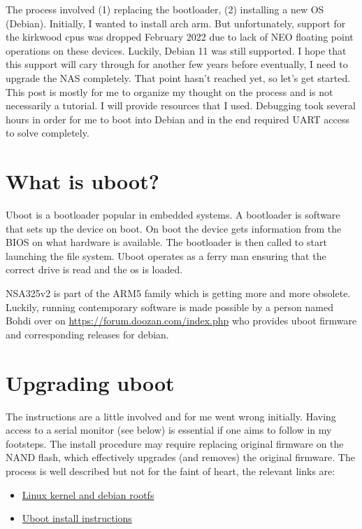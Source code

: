 \documentclass[11pt]{article}
\begin{document}
The  process  involved  (1) replacing  the  bootloader,  (2)
installing a new OS (Debian). Initially, I wanted to install
arch arm.  But unfortunately, support for  the kirkwood cpus
was dropped February 2022 due  to lack of NEO floating point
operations on  these devices.  Luckily, Debian 11  was still
supported. I  hope that this  support will cary  through for
another few years  before eventually, I need  to upgrade the
NAS completely. That point hasn't  reached yet, so let's get
started. This post  is mostly for me to  organize my thought
on the  process and  is not necessarily  a tutorial.  I will
provide resources that I  used. Debugging took several hours
in order for me to boot  into Debian and in the end required
UART access to solve completely.

\section{What is uboot?}
\label{sec:orgc5766ea}
Uboot  is  a  bootloader  popular  in  embedded  systems.  A
bootloader is software  that sets up the device  on boot. On
boot  the device  gets  information from  the  BIOS on  what
hardware  is available.  The  bootloader is  then called  to
start launching the  file system. Uboot operates  as a ferry
man ensuring  that the correct drive  is read and the  os is
loaded.

NSA325v2 is  part of the  ARM5 family which is  getting more
and more obsolete. Luckily, running contemporary software is
made   possible   by   a   person  named   Bohdi   over   on
\url{https://forum.doozan.com/index.php}   who    provides   uboot
firmware and corresponding releases for debian.

\section{Upgrading uboot}
\label{sec:org1b6d336}
The instructions are a little involved and for me went wrong
initially. Having access to a  serial monitor (see below) is
essential if one aims to follow in my footsteps. The install
procedure  may require  replacing original  firmware on  the
NAND flash,  which effectively  upgrades (and  removes) the
original firmware. The process is well described but not for
the faint of heart, the relevant links are:

\begin{itemize}
\item \href{https://forum.doozan.com/read.php?2,12096}{Linux kernel and debian rootfs}
\item \href{https://forum.doozan.com/read.php?3,12381}{Uboot install
instructions}
\end{itemize}
\end{document}
